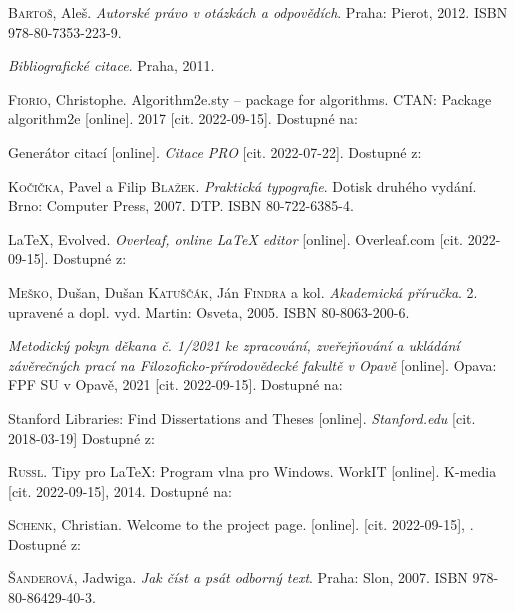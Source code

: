 \begin{thebibliography}{99}
\textsc{Bartoš}, Aleš. \emph{Autorské právo v otázkách a odpovědích}. Praha: Pierot, 2012. ISBN 978-80-7353-223-9.

\emph{Bibliografické citace}. Praha, 2011.

\textsc{Fiorio}, Christophe. Algorithm2e.sty -- package for algorithms. CTAN: Package algorithm2e [online]. 2017 [cit. 2022-09-15]. Dostupné na: 

Generátor citací [online]. \emph{Citace PRO} [cit. 2022-07-22]. Dostupné z: 

\textsc{Kočička}, Pavel a Filip \textsc{Blažek}. \emph{Praktická typografie}. Dotisk druhého vydání. Brno: Computer Press, 2007. DTP. ISBN 80-722-6385-4.


\LaTeX, Evolved. \emph{Overleaf, online \LaTeX{} editor} [online]. Overleaf.com [cit. 2022-09-15]. Dostupné z: 


\textsc{Meško}, Dušan, Dušan \textsc{Katuščák}, Ján \textsc{Findra} a kol. \emph{Akademická příručka}. 2. upravené a dopl. vyd. Martin: Osveta, 2005. ISBN 80-8063-200-6.

\emph{Metodický pokyn děkana č. 1/2021 ke zpracování, zveřejňování a ukládání závěrečných prací na Filozoficko-přírodovědecké fakultě v Opavě} [online]. Opava: FPF SU v Opavě, 2021 [cit. 2022-09-15]. Dostupné na: 

Stanford Libraries: Find Dissertations and Theses [online]. \emph{Stanford.edu} [cit. 2018-03-19] Dostupné z: 


\textsc{Russl}. Tipy pro LaTeX: Program vlna pro Windows. WorkIT [online]. K-media [cit. 2022-09-15], 2014. Dostupné na:

\textsc{Schenk}, Christian. Welcome to the \MikTeX{} project page. \MikTeX{} [online]. [cit. 2022-09-15], . Dostupné z: 

\textsc{Šanderová}, Jadwiga. \emph{Jak číst a psát odborný text}. Praha: Slon, 2007. ISBN 978-80-86429-40-3.



\end{thebibliography}



